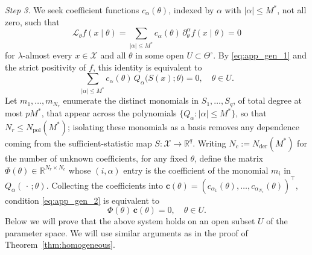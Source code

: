 \documentclass[11pt,twoside]{article} %
\begin{document}
\vspace{0.5 em}
\noindent
\emph{Step 3.}
We seek coefficient functions $c_\alpha(\theta)$, indexed by $\alpha$ with $|\alpha|\le M^*$, not all zero,
such that
\begin{equation*}
    \mathcal L_\theta f(x\mid\theta)
    =\sum_{|\alpha|\le M^*}c_\alpha(\theta)\,\partial^\alpha_\theta f(x\mid\theta)=0
\end{equation*}
for $\lambda$-almost every $x\in\mathcal X$ and all $\theta$ in some open $U\subset \Theta^\circ$. By \eqref{eq:app_gen_1} and the strict positivity of $f$, this identity is equivalent to
\begin{equation}
    \sum_{|\alpha|\le M^*}c_\alpha(\theta)\,Q_\alpha\big(S(x);\theta\big)=0, \quad \theta \in U.
    \label{eq:app_gen_2}
\end{equation}
Let $m_1,\dots,m_{N_r}$ enumerate the distinct monomials in $S_1,\dots,S_q$, of total degree at most $pM^*$,
that appear across the polynomials $\{Q_\alpha:|\alpha|\le M^*\}$, so that $N_r\le N_{\mathrm{pol}}(M^*)$;
isolating these monomials as a basis removes any dependence coming from the sufficient-statistic map
$S:\mathcal X\to\mathbb R^q$. Writing $N_c:=N_{\mathrm{der}}(M^*)$ for the number of unknown coefficients, for any fixed $\theta$, 
define the matrix $\Phi(\theta)\in\mathbb R^{N_r\times N_c}$ whose $(i,\alpha)$ entry is the coefficient of the
monomial $m_i$ in $Q_\alpha(\,\cdot\,;\theta)$. Collecting the coefficients into
$\mathbf c(\theta)=(c_{\alpha_1}(\theta),\dots,c_{\alpha_{N_c}}(\theta))^\top$, condition \eqref{eq:app_gen_2}
is equivalent to
\begin{equation}
    \Phi(\theta)\,\mathbf c(\theta)=0 , \quad \theta \in U.
    \label{eq:app_gen_3}
\end{equation}
Below we will prove that the above system holds on an open subset $U$ of the parameter space. We will use similar arguments as in the proof of Theorem~\ref{thm:homogeneous}.
\end{document}

